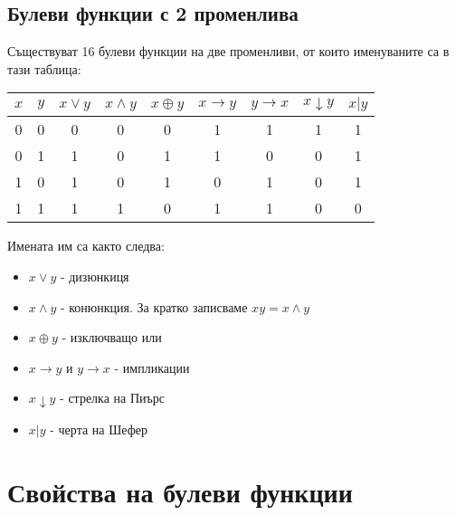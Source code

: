 \documentclass[fleqn,12pt]{article}
\begin{document}
\begin{flushleft}
\subsection{Булеви функции с 2 променлива}
Съществуват 16 булеви функции на две променливи, от които именуваните са в тази таблица:
\begin{center}
\begin{tabular}{ |c|c|c|c|c|c|c|c|c| } 
    \hline
    $x$ & $y$ & $x \vee y$ & $x \wedge y$ & $x \oplus y$ & $x \rightarrow y$ & $y \rightarrow x$ & $x \downarrow y$ & $x | y$ \\ 
    \hline
    0 & 0 & 0 & 0 & 0 & 1 & 1 & 1 & 1 \\ 
    0 & 1 & 1 & 0 & 1 & 1 & 0 & 0 & 1 \\ 
    1 & 0 & 1 & 0 & 1 & 0 & 1 & 0 & 1 \\ 
    1 & 1 & 1 & 1 & 0 & 1 & 1 & 0 & 0 \\ 
    \hline
\end{tabular}
\end{center}
Имената им са както следва:
\begin{itemize}
    \item $x \vee y$ - дизюнкиця
    \item $x \wedge y$ - конюнкция. За кратко записваме $xy = x \wedge y$
    \item $x \oplus y$ - изключващо или
    \item $x \rightarrow y$ и $y \rightarrow x$ - импликации
    \item $x \downarrow y$ - стрелка на Пиърс
    \item $x|y$ - черта на Шефер
\end{itemize}

\section{Свойства на булеви функции}


\end{flushleft}
\end{document}
